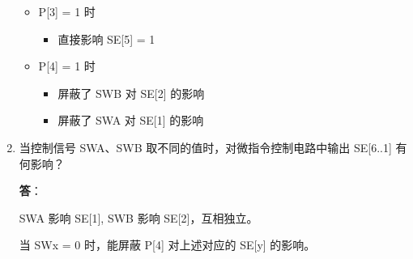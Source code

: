 \begin{enumerate}
\begin{itemize}
        \item P[3] = 1 时
        
        \begin{itemize}
            \item 直接影响 SE[5] = 1
        \end{itemize}
        
        \item P[4] = 1 时
        
        \begin{itemize}
            \item 屏蔽了 SWB 对 SE[2] 的影响
            \item 屏蔽了 SWA 对 SE[1] 的影响
        \end{itemize}
    \end{itemize}
    
    \item 当控制信号 SWA、SWB 取不同的值时，对微指令控制电路中输出 SE[6..1] 有何影响？
    
    \textbf{答}：
    
    SWA 影响 SE[1], SWB 影响 SE[2]，互相独立。
    
    当 SWx = 0 时，能屏蔽 P[4] 对上述对应的 SE[y] 的影响。
    
\end{enumerate}
